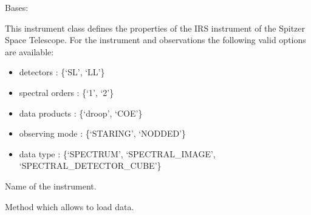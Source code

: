 \documentclass[a4paper,10pt,english]{sphinxmanual}
\begin{document}

\begin{fulllineitems}
\label{\detokenize{cascade.instruments:cascade.instruments.instruments.SpitzerIRS}}
Bases: {\hyperref[\detokenize{cascade.instruments:cascade.instruments.instruments.InstrumentBase}]{}}

This instrument class defines the properties of the IRS instrument of
the Spitzer Space Telescope.
For the instrument and observations the following valid options are
available:
\begin{itemize}
\item {} 
detectors :  \{‘SL’, ‘LL’\}

\item {} 
spectral orders : \{‘1’, ‘2’\}

\item {} 
data products : \{‘droop’, ‘COE’\}

\item {} 
observing mode : \{‘STARING’, ‘NODDED’\}

\item {} 
data type : \{‘SPECTRUM’, ‘SPECTRAL\_IMAGE’, ‘SPECTRAL\_DETECTOR\_CUBE’\}

\end{itemize}

\begin{fulllineitems}
\label{\detokenize{cascade.instruments:cascade.instruments.instruments.SpitzerIRS.name}}
Name of the instrument.

\end{fulllineitems}


\begin{fulllineitems}
\label{\detokenize{cascade.instruments:cascade.instruments.instruments.SpitzerIRS.load_data}}
Method which allows to load data.

\end{fulllineitems}


\end{fulllineitems}
\end{document}
